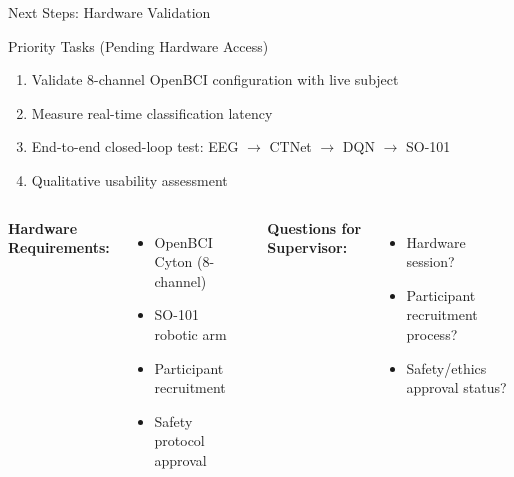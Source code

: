 \documentclass[aspectratio=169, 11pt]{beamer}
\begin{document}
\begin{frame}{Next Steps: Hardware Validation}
    \begin{block}{Priority Tasks (Pending Hardware Access)}
        \begin{enumerate}
            \item Validate 8-channel OpenBCI configuration with live subject
            \item Measure real-time classification latency
            \item End-to-end closed-loop test: EEG $\rightarrow$ CTNet $\rightarrow$ DQN $\rightarrow$ SO-101
            \item Qualitative usability assessment
        \end{enumerate}
    \end{block}
    
    \vspace{5mm}
    
    \begin{columns}[T]
        \textbf{Hardware Requirements:}
        \begin{itemize}
            \item OpenBCI Cyton (8-channel)
            \item SO-101 robotic arm
            \item Participant recruitment
            \item Safety protocol approval
        \end{itemize}
        
        \textbf{Questions for Supervisor:}
        \begin{itemize}
            \item Hardware session?
            \item Participant recruitment process?
            \item Safety/ethics approval status?
        \end{itemize}
    \end{columns}
\end{frame}
\end{document}
